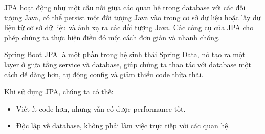 JPA hoạt động như một cầu nối giữa các quan hệ trong database với các đối tượng Java, có thể persist một đối tượng Java vào trong cơ sở dữ liệu hoặc lấy dữ liệu từ cơ sở dữ liệu và ánh xạ ra các đối tượng Java. Các công cụ của JPA cho phép chúng ta thực hiện điều đó một cách đơn giản và nhanh chóng.\par

Spring Boot JPA là một phần trong hệ sinh thái Spring Data, nó tạo ra một layer ở giữa tầng service và database, giúp chúng ta thao tác với database một cách dễ dàng hơn, tự động config và giảm thiểu code thừa thãi.\par

Khi sử dụng JPA, chúng ta có thế:
\begin{itemize}
    \item Viết ít code hơn, nhưng vẫn có được performance tốt.
    \item Độc lập về database, không phải làm việc trực tiếp với các quan hệ.
\end{itemize}